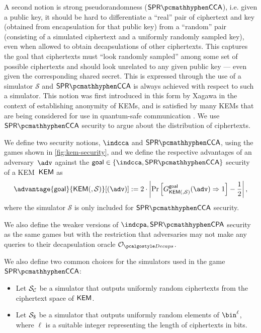 A second notion is strong pseudorandomness ($\sprcca$), i.e. given a public key, it should be hard to differentiate a ``real'' pair of ciphertext and key (obtained from encapsulation for that public key) from a ``random'' pair (consisting of a simulated ciphertext and a uniformly randomly sampled key), even when allowed to obtain decapsulations of other ciphertexts.
This captures the goal that ciphertexts must ``look randomly sampled'' among some set of possible ciphertexts and should look unrelated to any given public key --- even given the corresponding shared secret.
This is expressed through the use of a simulator $\mathcal S$ and $\sprcca$ is always achieved with respect to such a simulator.
This notion was first introduced in this form by Xagawa \cite{EC:Xagawa22} in the context of establishing anonymity of KEMs, and is satisfied by many KEMs that are being considered for use in quantum-safe communication \cite{EC:Xagawa22}. We use $\sprcca$ security to argue about the distribution of ciphertexts.

\begin{definition} \label{def:kem-security}
    We define two security notions, $\indcca$ and $\sprcca$, using the games shown in \cref{fig:kem-security}, and we define the respective advantages of an adversary~$\adv$ against the $\mathsf{goal} \in \{\indcca, \sprcca\}$ security of a KEM~$\mathsf{KEM}$ as
    \[
        \advantage{\mathsf{goal}}{\KEM(, \mathcal{S})}[(\adv)] := 2 \cdot \left| \Pr \left[ G^{\mathsf{goal}}_{\KEM(, \mathcal{S})}(\adv) \Rightarrow 1 \right] - \frac{1}{2} \right|,
    \]
    where the simulator $\mathcal{S}$ is only included for $\sprcca$ security.

    We also define the weaker versions of $\indcpa,\sprcpa$ security as the same games but with the restriction that adversaries may not make any queries to their decapsulation oracle $\decapsoracle$.

    We also define two common choices for the simulators used in the game $\sprcca$: \begin{itemize}
        \item Let $\mathcal{S}_\mathcal{C}$ be a simulator that outputs uniformly random ciphertexts from the ciphertext space of $\mathsf{KEM}$.
        \item Let $\simulbin$ be a simulator that outputs uniformly random elements of $\bin^\ell$, where $\ell$ is a suitable integer representing the length of ciphertexts in bits.
    \end{itemize}
\end{definition}

